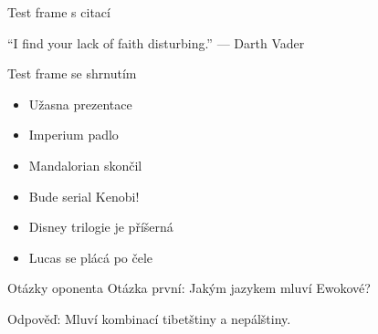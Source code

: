 \documentclass[czech,aspectratio=169,12pt]{beamer}   %
\begin{document}
\begin{frame}{Test frame s citací}
    \begin{center}
        {\large ``I find your lack of faith disturbing.''}
        \vskip5mm
        --- Darth Vader
    \end{center}
\end{frame}

\begin{frame}{Test frame se shrnutím}
    \begin{itemize}
        \item Užasna prezentace
        \item Imperium padlo
        \item Mandalorian skončil
        \item Bude serial Kenobi!
        \item Disney trilogie je příšerná
        \item Lucas se plácá po čele
    \end{itemize}
\end{frame}

\begin{frame}[noframenumbering]{Otázky oponenta}
    Otázka první:
    Jakým jazykem mluví Ewokové?

    \vfill

    Odpověď: Mluví kombinací tibetštiny a nepálštiny.
\end{frame}
\end{document}
